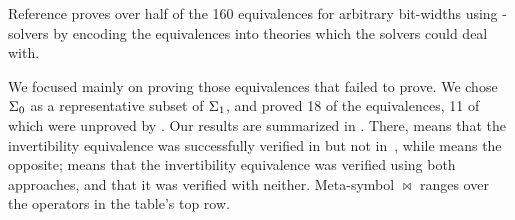\documentclass[10pt,conference]{IEEEtran}
\begin{document}
Reference \cite{b2} proves over half of the 160 
equivalences for arbitrary bit-widths 
using \smt-solvers by encoding the equivalences 
into theories which the solvers could deal with.

We focused mainly on proving those equivalences 
that \cite{b2} failed to prove. We chose $\Sigma_{0}$ as a 
representative subset of $\Sigma_{1}$, and proved 18 of the 
equivalences, 11 of which were unproved by \cite{b2}. Our 
results are summarized in .
There, \coqp means that the invertibility 
equivalence was successfully verified in \coq
but not in~\cite{b2}, while \cadep means the 
opposite; \both means that the invertibility 
equivalence was verified using both approaches, 
and \none that it was verified with neither.
Meta-symbol $\bowtie$ ranges over the operators 
in the table's top row.
\end{document}
